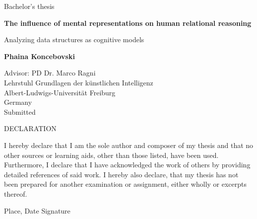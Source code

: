 \documentclass{article}
\date{\displaydate{date}}
\begin{document}
\begin{titlepage}
	\begin{center}
	\Large Bachelor's thesis \par
	\vspace*{1cm}
	\Huge \textbf{The influence of mental representations on human relational reasoning} \par
	\vspace{0.5cm}
        \LARGE Analyzing data structures as cognitive models
    \vspace{1.5cm}
        
    \textbf{Phaina Koncebovski}
        
    \vfill
     
     \vspace{5cm}
        
     \Large
     Advisor: PD Dr. Marco Ragni\\
     Lehrstuhl Grundlagen der künstlichen Intelligenz\\
     Albert-Ludwigs-Universität Freiburg\\
     Germany\\
     Submitted 
        
        
    \newpage
    \Large DECLARATION
    \end{center}

    I hereby declare that I am the sole author and composer of my thesis and that no other sources or 			learning aids, other than those listed, have been used. Furthermore, I declare that I have 					acknowledged the work of others by providing detailed references of said work.
	I hereby also declare, that my thesis has not been prepared for another examination
	or assignment, either wholly or excerpts thereof.    

	\vspace{5cm}    
    
    \noindent Place, Date \hspace{5cm} Signature
    
\end{titlepage}
\end{document}
